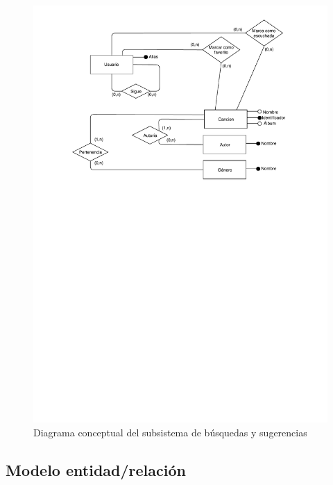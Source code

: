 \begin{figure}[H]
  \caption{Diagrama conceptual del subsistema de búsquedas y sugerencias}
  \centering
  \includegraphics{diagramas/busqueda_modelo_conceptual.pdf}
\end{figure}

\subsection{Modelo entidad/relación}

